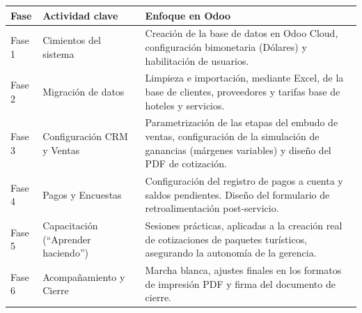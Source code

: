 \renewcommand{\arraystretch}{1.4}
\begin{tabularx}{\textwidth}{|>{\raggedright\arraybackslash}p{2.1cm}|>{\raggedright\arraybackslash}p{3.2cm}|X|}
    \hline
    \textbf{Fase} & \textbf{Actividad clave} & \textbf{Enfoque en Odoo} \\ \hline
    Fase 1 & Cimientos del sistema & Creación de la base de datos en Odoo Cloud, configuración bimonetaria (Dólares) y habilitación de usuarios. \\ \hline
    Fase 2 & Migración de datos & Limpieza e importación, mediante Excel, de la base de clientes, proveedores y tarifas base de hoteles y servicios. \\ \hline
    Fase 3 & Configuración CRM y Ventas & Parametrización de las etapas del embudo de ventas, configuración de la simulación de ganancias (márgenes variables) y diseño del PDF de cotización. \\ \hline
    Fase 4 & Pagos y Encuestas & Configuración del registro de pagos a cuenta y saldos pendientes. Diseño del formulario de retroalimentación post-servicio. \\ \hline
    Fase 5 & Capacitación (``Aprender haciendo'') & Sesiones prácticas, aplicadas a la creación real de cotizaciones de paquetes turísticos, asegurando la autonomía de la gerencia. \\ \hline
    Fase 6 & Acompañamiento y Cierre & Marcha blanca, ajustes finales en los formatos de impresión PDF y firma del documento de cierre. \\ \hline
\end{tabularx}

